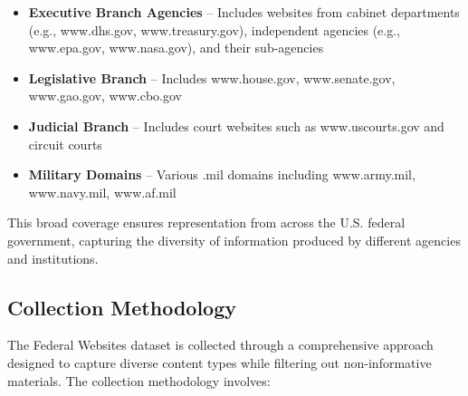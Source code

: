 \begin{itemize}
  \item \textbf{Executive Branch Agencies} -- Includes websites from cabinet departments (e.g., www.dhs.gov, www.treasury.gov), independent agencies (e.g., www.epa.gov, www.nasa.gov), and their sub-agencies
  \item \textbf{Legislative Branch} -- Includes www.house.gov, www.senate.gov, www.gao.gov, www.cbo.gov
  \item \textbf{Judicial Branch} -- Includes court websites such as www.uscourts.gov and circuit courts
  \item \textbf{Military Domains} -- Various .mil domains including www.army.mil, www.navy.mil, www.af.mil
\end{itemize}

This broad coverage ensures representation from across the U.S. federal government, capturing the diversity of information produced by different agencies and institutions.

\subsection{Collection Methodology}

The Federal Websites dataset is collected through a comprehensive approach designed to capture diverse content types while filtering out non-informative materials. The collection methodology involves:

